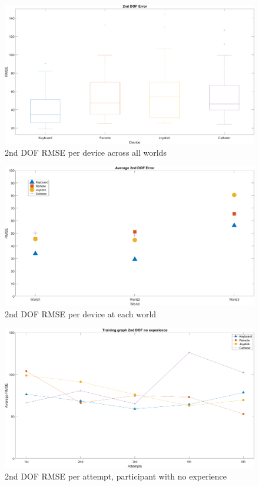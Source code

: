 \begin{figure}[ht]
   \centering
   \includegraphics[width=1.0\textwidth]{img/2nd/2ndError.png}
   \caption{2nd DOF RMSE per device across all worlds}
   \label{img:2ndError}
\end{figure}

\begin{figure}[ht]
   \centering
   \includegraphics[width=1.0\textwidth]{img/2nd/2ndAvgError.png}
   \caption{2nd DOF RMSE per device at each world}
   \label{img:2ndAvgError}
\end{figure}

\begin{figure}[ht]
   \centering
   \includegraphics[width=1.0\textwidth]{img/2nd/2ndTrainNoExp.png}
   \caption{2nd DOF RMSE per attempt, participant with no experience}
   \label{img:2ndTrainNoExp}
\end{figure}

